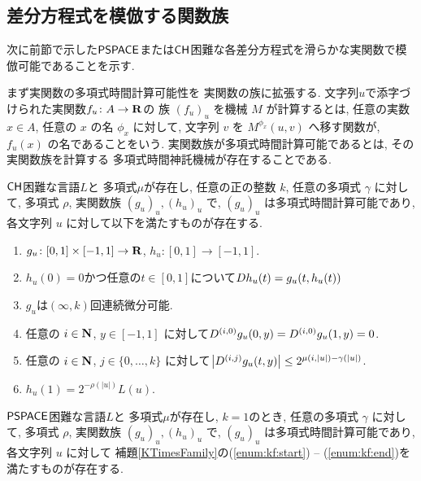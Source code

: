 \subsection{差分方程式を模倣する関数族}
\label{subsection: ode family}
次に前節で示した$\mathsf{PSPACE}$または$\mathsf{CH}$困難な各差分方程式を滑らかな実関数で模倣可能であることを示す.

まず実関数の多項式時間計算可能性を
実関数の族に拡張する.
文字列$u$で添字づけられた実関数$f _u \colon A \to \mathbf R$の
族 $(f_u)_u$ を機械 $M$ が計算するとは,
任意の実数 $x \in A$, 任意の $x$ の名 $\phi_x$ に対して,
文字列 $v$ を $M ^{\phi _x} (u, v)$ へ移す関数が, 
$f _u (x)$ の名であることをいう.
実関数族が多項式時間計算可能であるとは, その実関数族を計算する
多項式時間神託機械が存在することである.

 \begin{lemma}
  \label{KTimesFamily}
  $\mathsf{CH}$困難な言語$L$と
  多項式$\mu$が存在し,
  任意の正の整数 $k$,
  任意の多項式 $\gamma$ に対して,
  多項式 $\rho$, 実関数族 $(g_u)_u, (h_u)_u$ で, 
  $(g_u)_u$ は多項式時間計算可能であり,
  各文字列 $u$ に対して以下を満たすものが存在する.
  \begin{enumerate}
   \item \label{enum:kf:start}
     $g_u\colon [0,1] \times [-1,1]\to \mathbf R$, $h_u\colon [0,1] \to [-1,1]$. 
   \item \label{enum:equation}
	 $h_u(0) = 0$かつ任意の$t \in [0,1]$について$D h_u(t) = g_u(t, h_u(t))$
   \item \label{enum:differentiability}
         $g_u$は$(\infty, k)$回連続微分可能.
   \item \label{enum:boundary}
	 任意の $i \in \mathbf N$, $y \in [-1,1]$ に対して$
	  D^{(i, 0)} g_u(0,y) = D^{(i, 0)} g_u(1,y) = 0
         $.
   \item \label{enum:smooth}
	 任意の $i \in \mathbf N$, $j \in \{0, \dots, k\}$ に対して$
	  \left|D^{(i,j)} g_u(t,y)\right| \le 2^{\mu(i, |u|) - \gamma(|u|)}
         $.
   \item \label{enum:kf:end}
	 $h_u(1) = 2^{-\rho(|u|)} L(u)$.
  \end{enumerate}
 \end{lemma}

\begin{lemma}
 \label{DifferentiableFamily}
 $\mathsf{PSPACE}$困難な言語$L$と
 多項式$\mu$が存在し, 
 $k = 1$のとき,
 任意の多項式 $\gamma$ に対して,
 多項式 $\rho$, 実関数族 $(g_u)_u, (h_u)_u$ で, 
 $(g_u)_u$ は多項式時間計算可能であり,
 各文字列 $u$ に対して
 補題\ref{KTimesFamily}の(\ref{enum:kf:start}) -- (\ref{enum:kf:end})を満たすものが存在する.
\end{lemma}


